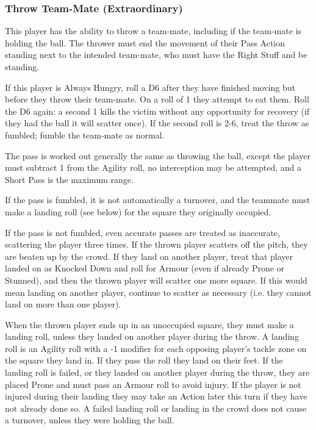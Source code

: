 \begin{multicols}{3}
\subsubsection{Throw Team-Mate (Extraordinary)}
\par This player has the ability to throw a team-mate, including if the team-mate is holding the ball. The thrower must end the movement of their Pass Action standing next to the intended team-mate, who must have the Right Stuff and be standing.
\par If this player is Always Hungry, roll a D6 after they have finished moving but before they throw their team-mate. On a roll of 1 they attempt to eat them. Roll the D6 again: a second 1 kills the victim without any opportunity for recovery (if they had the ball it will scatter once). If the second roll is 2-6, treat the throw as fumbled; fumble the team-mate as normal.
\par The pass is worked out generally the same as throwing the ball, except the player must subtract 1 from the Agility roll, no interception may be attempted, and a Short Pass is the maximum range.
\par If the pass is fumbled, it is not automatically a turnover, and the teammate must make a landing roll (see below) for the square they originally occupied.
\par If the pass is not fumbled, even accurate passes are treated as inaccurate, scattering the player three times. If the thrown player scatters off the pitch, they are beaten up by the crowd. If they land on another player, treat that player landed on as Knocked Down and roll for Armour (even if already Prone or Stunned), and then the thrown player will scatter one more square. If this would mean landing on another player, continue to scatter as necessary (i.e. they cannot land on more than one player).
\par When the thrown player ends up in an unoccupied square, they must make a landing roll, unless they landed on another player during the throw. A landing roll is an Agility roll with a -1 modifier for each opposing player's tackle zone on the square they land in. If they pass the roll they land on their feet. If the landing roll is failed, or they landed on another player during the throw, they are placed Prone and must pass an Armour roll to avoid injury. If the player is not injured during their landing they may take an Action later this turn if they have not already done so. A failed landing roll or landing in the crowd does not cause a turnover, unless they were holding the ball.


\end{multicols}
